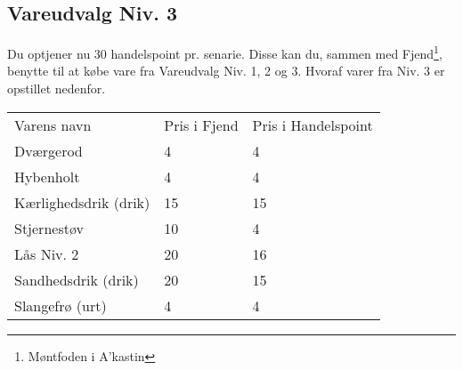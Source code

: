 \subsection*{Vareudvalg Niv. 3}
Du optjener nu 30 handelspoint pr. senarie. Disse kan du, sammen med Fjend\footnote{Møntfoden i A'kastin}, benytte til at købe vare fra Vareudvalg Niv. 1, 2 og 3. Hvoraf varer fra Niv. 3 er opstillet nedenfor.
\begin{table}[H]
    \centering
    \begin{tabular}{|p{}|p{}|p{}|}
    \hline
    \rowcolor{cerulean!80}
    \multicolumn{3}{c}{Vareudvalg Niv. 3}\\
    \hline
    \rowcolor{cerulean!40}
         Varens navn & Pris i Fjend & Pris i Handelspoint \\\hline
         Dværgerod & 4 & 4\\\hline
         Hybenholt & 4 & 4\\\hline
         Kærlighedsdrik (drik) & 15 & 15\\\hline
         Stjernestøv & 10 & 4 \\\hline
         Lås Niv. 2 & 20 & 16\\\hline
         Sandhedsdrik (drik) & 20 & 15\\\hline
         Slangefrø (urt) & 4 & 4\\\hline
    \end{tabular}
    \end{table}